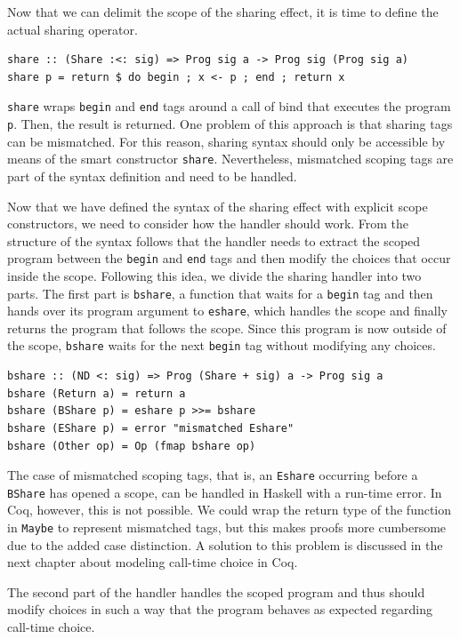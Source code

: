 \documentclass[a4paper, 11pt, fleqn, twoside]{scrreprt}
\newcommand{\hinl}[1]{\texttt{#1}}
\begin{document}
Now that we can delimit the scope of the sharing effect, it is time to define the actual sharing operator.


\begin{verbatim}
share :: (Share :<: sig) => Prog sig a -> Prog sig (Prog sig a)
share p = return $ do begin ; x <- p ; end ; return x
\end{verbatim}

\hinl{share} wraps \hinl{begin} and \hinl{end} tags around a call of bind that executes the program \hinl{p}.
Then, the result is returned.
One problem of this approach is that sharing tags can be mismatched.
For this reason, sharing syntax should only be accessible by means of the smart constructor \hinl{share}.
Nevertheless, mismatched scoping tags are part of the syntax definition and need to be handled.

Now that we have defined the syntax of the sharing effect with explicit scope constructors, we need to consider how the handler should work.
From the structure of the syntax follows that the handler needs to extract the scoped program between the \hinl{begin} and \hinl{end} tags and then modify the choices that occur inside the scope.
Following this idea, we divide the sharing handler into two parts.
The first part is \hinl{bshare}, a function that waits for a \hinl{begin} tag and then hands over its program argument to \hinl{eshare}, which handles the scope and finally returns the program that follows the scope.
Since this program is now outside of the scope, \hinl{bshare} waits for the next \hinl{begin} tag without modifying any choices.

\begin{verbatim}
bshare :: (ND <: sig) => Prog (Share + sig) a -> Prog sig a
bshare (Return a) = return a
bshare (BShare p) = eshare p >>= bshare
bshare (EShare p) = error "mismatched Eshare"
bshare (Other op) = Op (fmap bshare op)
\end{verbatim}

The case of mismatched scoping tags, that is, an \hinl{Eshare} occurring before a \hinl{BShare} has opened a scope, can be handled in Haskell with a run-time error.
In Coq, however, this is not possible.
We could wrap the return type of the function in \hinl{Maybe} to represent mismatched tags, but this makes proofs more cumbersome due to the added case distinction.
A solution to this problem is discussed in the next chapter about modeling call-time choice in Coq.

The second part of the handler handles the scoped program and thus should modify choices in such a way that the program behaves as expected regarding call-time choice.
\end{document}
